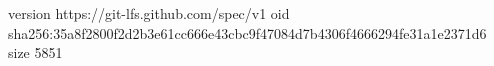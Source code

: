 version https://git-lfs.github.com/spec/v1
oid sha256:35a8f2800f2d2b3e61cc666e43cbc9f47084d7b4306f4666294fe31a1e2371d6
size 5851
